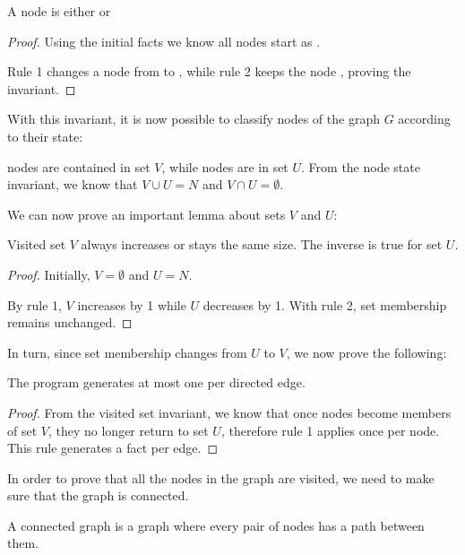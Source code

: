 \begin{invariant}
A node is either  or 
\end{invariant}
\begin{proof}
Using the initial facts we know all nodes start as .

Rule 1 changes a node from  to , while rule 2
keeps the node , proving the invariant.
\end{proof}

With this invariant, it is now possible to classify nodes of the graph $G$
according to their state:

\begin{definition}  nodes are contained in set $V$,
while  nodes are in set $U$. From the node state invariant, we
know that $V \cup U = N$ and $V \cap U = \emptyset$.
\end{definition}

We can now prove an important lemma about sets $V$ and $U$:

\begin{invariant}
Visited set $V$ always increases or stays the same size. The inverse is true for
set $U$.
\end{invariant}
\begin{proof}
Initially, $V = \emptyset$ and $U = N$.

By rule 1, $V$ increases by 1 while $U$ decreases by 1. With rule 2, set
membership remains unchanged.
\end{proof}

In turn, since set membership changes from $U$ to $V$, we now prove the
following:

\begin{lemma}
The program generates at most one  per directed edge.
\end{lemma}
\begin{proof}
From the visited set invariant, we know that once nodes become members of set $V$,
they no longer return to set $U$, therefore rule 1 applies once per
node. This rule generates a  fact per edge.
\end{proof}

In order to prove that all the nodes in the graph are visited, we need to make
sure that the graph is connected.

\begin{definition}
A connected graph is a graph where every pair of nodes has a path between them.
\end{definition}

